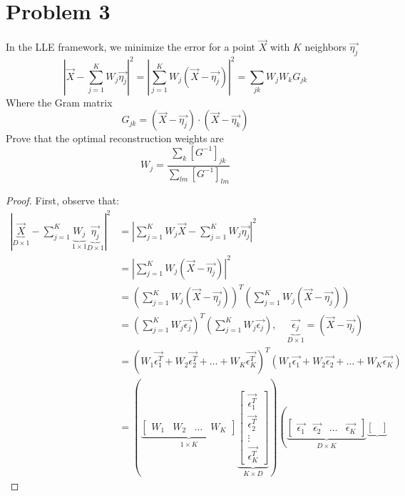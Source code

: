 \documentclass[12pt]{article}
\begin{document}
\section*{Problem 3}
	In the LLE framework, we minimize the error for a point $ \vec{X} $ with $ K $ neighbors $ \vec{\eta_j} $ 
	\[ \left| \vec{X}-\sum_{j=1}^{K}W_j \vec{\eta_j} \right|^2 = \left| \sum_{j=1}^{K}W_j \left( \vec{X} - \vec{\eta_j} \right)  \right|^2 = \sum_{jk} W_j W_k G_{jk}  \]
	Where the Gram matrix
	\[ G_{jk} = \left( \vec{X} - \vec{\eta_j} \right) \cdot \left( \vec{X} - \vec{\eta_k} \right) \]
	Prove that the optimal reconstruction weights are
	\[ W_j = \frac{ \sum_k [ G^{-1} ]_{jk} }{ \sum_{lm} [ G^{-1} ]_{lm} } \]
	\begin{proof}
		First, observe that:
		\begin{align*}
			\left| \underbrace{\vec{X}}_{D\times 1}-\sum_{j=1}^{K}\underbrace{W_j}_{1\times 1} \underbrace{\vec{\eta_j}}_{D\times 1} \right|^2 & = \left| \sum_{j=1}^{K}W_j \vec{X}-\sum_{j=1}^{K}W_j \vec{\eta_j} \right|^2\\
			&= \left| \sum_{j=1}^{K}W_j \left( \vec{X} - \vec{\eta_j} \right)  \right|^2 \\
			&=\left( \sum_{j=1}^{K}W_j \left( \vec{X} - \vec{\eta_j} \right)  \right)^T\left( \sum_{j=1}^{K}W_j \left( \vec{X} - \vec{\eta_j} \right)  \right) \\
			&= \left( \sum_{j=1}^{K}W_j \vec{\epsilon_{j}}   \right)^T \left( \sum_{j=1}^{K}W_j \vec{\epsilon_{j}} \right), \quad \underbrace{\vec{\epsilon_{j}}}_{D\times 1}=  \left( \vec{X} - \vec{\eta_j} \right) \\
			&= \left( W_1 \vec{\epsilon_{1}^T} + W_2 \vec{\epsilon_{2}^T}+\dots +W_K \vec{\epsilon_{K}^T}  \right)^T\left( W_1 \vec{\epsilon_{1}} + W_2 \vec{\epsilon_{2}}+\dots +W_K \vec{\epsilon_{K}}  \right)\\
			&= \left( \underbrace{\begin{bmatrix}
				W_1 & W_2 & \dots & W_K
			\end{bmatrix}}_{1\times K} \underbrace{\begin{bmatrix}
			\vec{\epsilon_{1}^T} \\ \vec{\epsilon_{2}^T} \\ \vdots \\ \vec{\epsilon_{K}^T}
			\end{bmatrix}}_{K\times D} \right) 
		\left( \underbrace{\begin{bmatrix}
			\vec{\epsilon_{1}} & \vec{\epsilon_{2}} & \dots & \vec{\epsilon_{K}}
			\end{bmatrix}}_{D\times K} \underbrace{\begin{bmatrix}

\end{bmatrix}}
\end{align*}
\end{proof}
\end{document}
